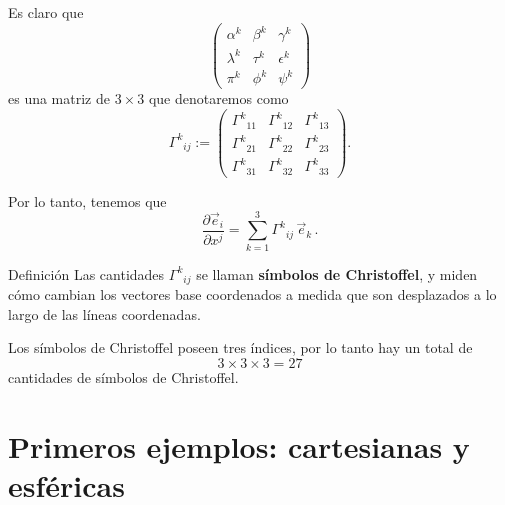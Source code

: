 \documentclass[../apunte_mecanica_clasica.tex]{subfiles}%
\begin{document}
Es claro que
\begin{equation*}
    \begin{pmatrix}
        \alpha^k & \beta^k & \gamma^k \\
        \lambda^k & \tau^k & \epsilon^k \\
        \pi^k & \phi^k & \psi^k
    \end{pmatrix}
\end{equation*}
es una matriz de $3 \times 3$ que denotaremos como
\begin{equation*}
    \Gamma^k{}_{ij} :=
    \begin{pmatrix}
        \Gamma^k{}_{11} & \Gamma^k{}_{12} & \Gamma^k{}_{13} \\
        \Gamma^k{}_{21} & \Gamma^k{}_{22} & \Gamma^k{}_{23} \\
        \Gamma^k{}_{31} & \Gamma^k{}_{32} & \Gamma^k{}_{33}
    \end{pmatrix}.
\end{equation*}

Por lo tanto, tenemos que
\begin{equation*}
    \frac{\partial \vec{e}_i}{\partial x^j} 
    = \sum_{k=1}^3 \Gamma^k{}_{ij} \, \vec{e}_k \,.
\end{equation*}

\begin{apuntebloque}{Definición}
Las cantidades $\Gamma^k{}_{ij}$ se llaman \textbf{símbolos de Christoffel}, 
y miden cómo cambian los vectores base coordenados a medida que son 
desplazados a lo largo de las líneas coordenadas.  

Los símbolos de Christoffel poseen tres índices, por lo tanto hay un total de
\[
3 \times 3 \times 3 = 27
\]
cantidades de símbolos de Christoffel.
\end{apuntebloque}


\section{Primeros ejemplos: cartesianas y esféricas}
\end{document}
